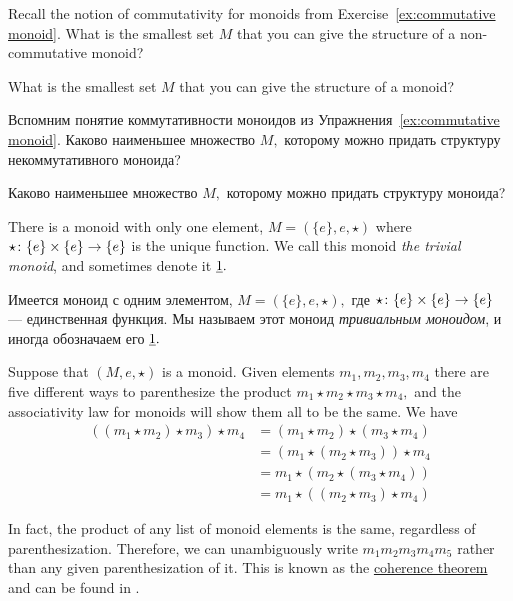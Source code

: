 \documentclass[CT4S-EN-RU]{subfiles}
\begin{document}
\begin{exerciseENG}
Recall the notion of commutativity for monoids from Exercise~\ref{ex:commutative monoid}.
\sexc What is the smallest set $M$ that you can give the structure of a non-commutative monoid?
\item What is the smallest set $M$ that you can give the structure of a monoid?
\endsexc
\end{exerciseENG}

\begin{exerciseRUS}
Вспомним понятие коммутативности моноидов из Упражнения~\ref{ex:commutative monoid}.
\sexc Каково наименьшее множество $M,$ которому можно придать структуру некоммутативного моноида?
\item Каково наименьшее множество $M,$ которому можно придать структуру моноида?
\endsexc
\end{exerciseRUS}

\begin{exampleENG}\label{ex:trivial monoid}
There is a monoid with only one element, $M=(\{e\},e,\star)$ where $\star\colon\{e\}\times\{e\}\rightarrow\{e\}$ is the unique function. We call this monoid {\em the trivial monoid}, and sometimes denote it $\underline{1}.$
\end{exampleENG}

\begin{exampleRUS}\label{ex:trivial monoid}
Имеется моноид с одним элементом, $M=(\{e\},e,\star),$ где $\star\colon\{e\}\times\{e\}\rightarrow\{e\}$ — единственная функция. Мы называем этот моноид {\em тривиальным моноидом}, и иногда обозначаем его $\underline{1}.$
\end{exampleRUS}

\begin{exampleENG}
Suppose that $(M,e,\star)$ is a monoid. Given elements $m_1,m_2,m_3,m_4$ there are five different ways to parenthesize the product $m_1\star m_2\star m_3\star m_4,$ and the associativity law for monoids will show them all to be the same. We have
\begin{align*}
((m_1\star m_2)\star m_3)\star m_4&=(m_1\star m_2)\star (m_3\star m_4)\\
&=(m_1\star(m_2\star m_3))\star m_4\\
&=m_1\star(m_2\star (m_3\star m_4))\\
&=m_1\star((m_2\star m_3)\star m_4)
\end{align*}

In fact, the product of any list of monoid elements is the same, regardless of parenthesization. Therefore, we can unambiguously write $m_1m_2m_3m_4m_5$ rather than any given parenthesization of it. This is known as the \href{http://en.wikipedia.org/wiki/Coherence_theorem}{\text coherence theorem} and can be found in \cite{Mac}.
\end{exampleENG}
\end{document}
